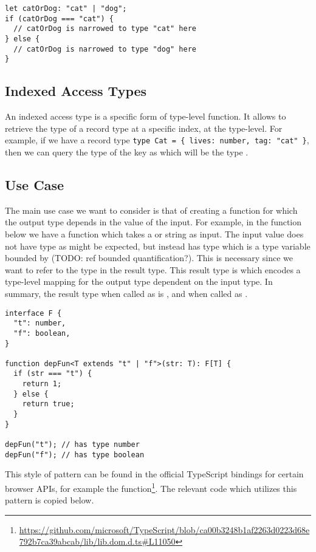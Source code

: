 \begin{lstlisting}
let catOrDog: "cat" | "dog";
if (catOrDog === "cat") {
  // catOrDog is narrowed to type "cat" here
} else {
  // catOrDog is narrowed to type "dog" here
}
\end{lstlisting}

\subsection{Indexed Access Types}

An indexed access type is a specific form of type-level function. It allows to retrieve the type of a record type at a specific index, at the type-level. For example, if we have a record type \lstinline+type Cat = { lives: number, tag: "cat"+\ \lstinline+}+, then we can query the type of the key  as  which will be the type .

\subsection{Use Case}

The main use case we want to consider is that of creating a function for which the output type depends in the value of the input. For example, in the  function below we have a function which takes a  or  string as input. The input value  does not have type  as might be expected, but instead has type  which is a type variable bounded by  (TODO: ref bounded quantification?). This is necessary since we want to refer to the type  in the result type. This result type is  which encodes a type-level mapping for the output type dependent on the input type. In summary, the result type when called as  is , and  when called as .

\begin{lstlisting}
interface F {
  "t": number,
  "f": boolean,
}

function depFun<T extends "t" | "f">(str: T): F[T] {
  if (str === "t") {
    return 1;
  } else {
    return true;
  }
}

depFun("t"); // has type number
depFun("f"); // has type boolean
\end{lstlisting}

This style of pattern can be found in the official TypeScript bindings for certain browser APIs, for example the  function\footnote{\url{https://github.com/microsoft/TypeScript/blob/ca00b3248b1af2263d0223d68e792b7ca39abcab/lib/lib.dom.d.ts\#L11050}}. The relevant code which utilizes this pattern is copied below.

